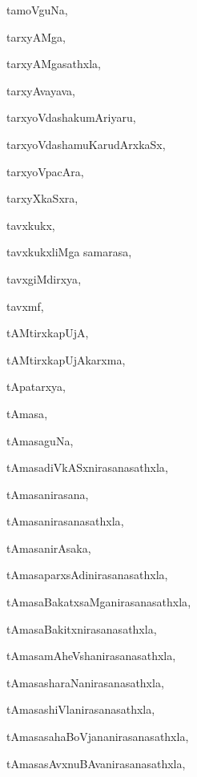 \begin{multicols}{2}
{tamoVguNa}, \pageref{tamoVguNa}

{tarxyAMga}, \pageref{tarxyAMga}

{tarxyAMgasathxla}, \pageref{tarxyAMgasathxla}

{tarxyAvayava}, \pageref{tarxyAvayava}

{tarxyoVdashakumAriyaru}, \pageref{tarxyoVdashakumAriyaru}

{tarxyoVdashamuKarudArxkaSx}, \pageref{tarxyoVdashamuKarudArxkaSx}

{tarxyoVpacAra}, \pageref{tarxyoVpacAra}

{tarxyXkaSxra}, \pageref{tarxyXkaSxra}

{tavxkukx}, \pageref{tavxkukx}

{tavxkukxliMga samarasa}, \pageref{tavxkukxliMga samarasa}

{tavxgiMdirxya}, \pageref{tavxgiMdirxya}

{tavxmf}, \pageref{tavxmf}

{tAMtirxkapUjA}, \pageref{tAMtirxkapUjA}

{tAMtirxkapUjAkarxma}, \pageref{tAMtirxkapUjAkarxma}

{tApatarxya}, \pageref{tApatarxya}

{tAmasa}, \pageref{tAmasa}

{tAmasaguNa}, \pageref{tAmasaguNa}

{tAmasadiVkASxnirasanasathxla}, \pageref{tAmasadiVkASxnirasanasathxla}

{tAmasanirasana}, \pageref{tAmasanirasana}

{tAmasanirasanasathxla}, \pageref{tAmasanirasanasathxla}

{tAmasanirAsaka}, \pageref{tAmasanirAsaka}

{tAmasaparxsAdinirasanasathxla}, \pageref{tAmasaparxsAdinirasanasathxla}

{tAmasaBakatxsaMganirasanasathxla}, \pageref{tAmasaBakatxsaMganirasanasathxla}

{tAmasaBakitxnirasanasathxla}, \pageref{tAmasaBakitxnirasanasathxla}

{tAmasamAheVshanirasanasathxla}, \pageref{tAmasamAheVshanirasanasathxla}

{tAmasasharaNanirasanasathxla}, \pageref{tAmasasharaNanirasanasathxla}

{tAmasashiVlanirasanasathxla}, \pageref{tAmasashiVlanirasanasathxla}

{tAmasasahaBoVjananirasanasathxla}, \pageref{tAmasasahaBoVjananirasanasathxla}

{tAmasasAvxnuBAvanirasanasathxla}, \pageref{tAmasasAvxnuBAvanirasanasathxla}


\end{multicols}
